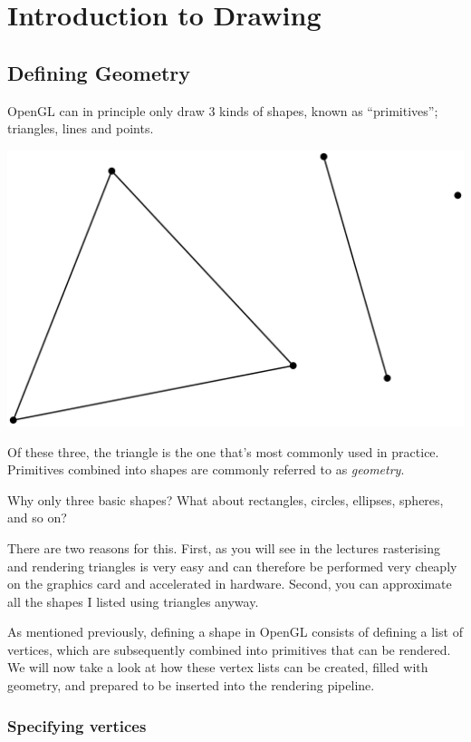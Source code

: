 \chapter{Introduction to Drawing}

\section{Defining Geometry}

OpenGL can in principle only draw 3 kinds of shapes, known as ``primitives''; triangles, lines and points.

\includegraphics[scale=0.15]{images/openGL_primitives.eps}

Of these three, the triangle is the one that's most commonly used in practice. Primitives combined into shapes are commonly referred to as \emph{geometry}.

Why only three basic shapes? What about rectangles, circles, ellipses, spheres, and so on? 

There are two reasons for this. First, as you will see in the lectures rasterising and rendering triangles is very easy and can therefore be performed very cheaply on the graphics card and accelerated in hardware. Second, you can approximate all the shapes I listed using triangles anyway. 

As mentioned previously, defining a shape in OpenGL consists of defining a list of vertices, which are subsequently combined into primitives that can be rendered. We will now take a look at how these vertex lists can be created, filled with geometry, and prepared to be inserted into the rendering pipeline.

\subsection{Specifying vertices}

